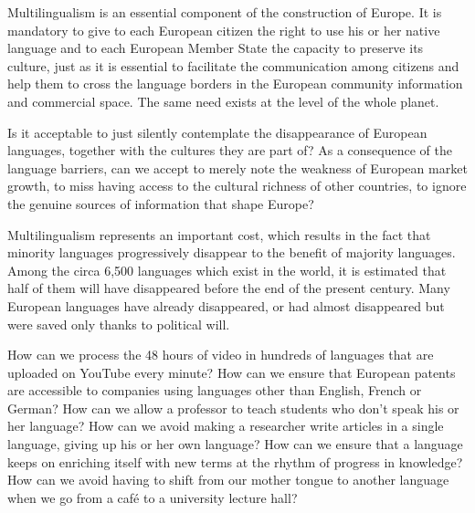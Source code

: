 
\begin{multicols}{2}
Multilingualism is an essential component of the construction of Europe. It is mandatory to give to each European citizen the right to use his or her native language and to each European Member State the capacity to preserve its culture, just as it is essential to facilitate the communication among citizens and help them to cross the language borders in the European community information and commercial space. The same need exists at the level of the whole planet.

Is it acceptable to just silently contemplate the disappearance of European languages, together with the cultures they are part of? As a consequence of the language barriers, can we accept to merely note the weakness of European market growth, to miss having access to the cultural richness of other countries, to ignore the genuine sources of information that shape Europe?

Multilingualism represents an important cost, which results in the fact that minority languages progressively disappear to the benefit of majority languages. Among the circa 6,500 languages which exist in the world, it is estimated that half of them will have disappeared before the end of the present century. Many European languages have already disappeared, or had almost disappeared but were saved only thanks to political will.

How can we process the 48 hours of video in hundreds of languages that are uploaded on YouTube every minute? How can we ensure that European patents are accessible to companies using languages other than English, French or German? How can we allow a professor to teach students who don’t speak his or her language? How can we avoid making a researcher write articles in a single language, giving up his or her own language? How can we ensure that a language keeps on enriching itself with new terms at the rhythm of progress in knowledge? How can we avoid having to shift from our mother tongue to another language when we go from a café to a university lecture hall? 


\end{multicols}

